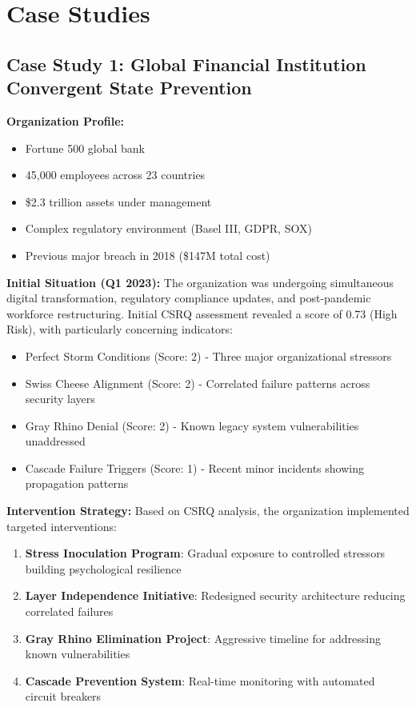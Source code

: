 \documentclass[11pt,a4paper]{article}
\begin{document}
\section{Case Studies}

\subsection{Case Study 1: Global Financial Institution Convergent State Prevention}

\textbf{Organization Profile:}
\begin{itemize}
\item Fortune 500 global bank
\item 45,000 employees across 23 countries
\item \$2.3 trillion assets under management
\item Complex regulatory environment (Basel III, GDPR, SOX)
\item Previous major breach in 2018 (\$147M total cost)
\end{itemize}

\textbf{Initial Situation (Q1 2023):}
The organization was undergoing simultaneous digital transformation, regulatory compliance updates, and post-pandemic workforce restructuring. Initial CSRQ assessment revealed a score of 0.73 (High Risk), with particularly concerning indicators:
\begin{itemize}
\item Perfect Storm Conditions (Score: 2) - Three major organizational stressors
\item Swiss Cheese Alignment (Score: 2) - Correlated failure patterns across security layers
\item Gray Rhino Denial (Score: 2) - Known legacy system vulnerabilities unaddressed
\item Cascade Failure Triggers (Score: 1) - Recent minor incidents showing propagation patterns
\end{itemize}

\textbf{Intervention Strategy:}
Based on CSRQ analysis, the organization implemented targeted interventions:
\begin{enumerate}
\item \textbf{Stress Inoculation Program}: Gradual exposure to controlled stressors building psychological resilience
\item \textbf{Layer Independence Initiative}: Redesigned security architecture reducing correlated failures
\item \textbf{Gray Rhino Elimination Project}: Aggressive timeline for addressing known vulnerabilities
\item \textbf{Cascade Prevention System}: Real-time monitoring with automated circuit breakers
\end{enumerate}
\end{document}
